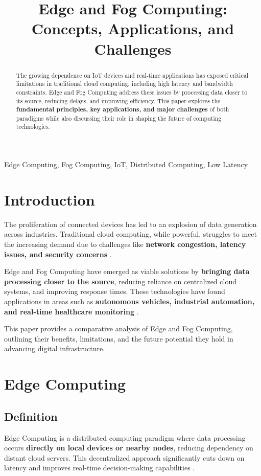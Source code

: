 \documentclass[conference]{IEEEtran}
\title{Edge and Fog Computing: Concepts, Applications, and Challenges}
\author{
	\IEEEauthorblockN{Dilyara Daroglu} 
	\IEEEauthorblockA{
		Paris Lodron University of Salzburg \\
		Wissenschaftliche Arbeitstechniken und Präsentationen \\
		Email: dilyara.daroglu@stud.plus.ac.at
	}
}
\begin{document}
	
	\maketitle
	
	\begin{abstract}
		The growing dependence on IoT devices and real-time applications has exposed critical limitations in traditional cloud computing, including high latency and bandwidth constraints. Edge and Fog Computing address these issues by processing data closer to its source, reducing delays, and improving efficiency. This paper explores the \textbf{fundamental principles, key applications, and major challenges} of both paradigms while also discussing their role in shaping the future of computing technologies.
	\end{abstract}
	
	\begin{IEEEkeywords}
		Edge Computing, Fog Computing, IoT, Distributed Computing, Low Latency
	\end{IEEEkeywords}
	
	\section{Introduction}
	The proliferation of connected devices has led to an explosion of data generation across industries. Traditional cloud computing, while powerful, struggles to meet the increasing demand due to challenges like \textbf{network congestion, latency issues, and security concerns} \cite{weber2021edge}. 
	
	Edge and Fog Computing have emerged as viable solutions by \textbf{bringing data processing closer to the source}, reducing reliance on centralized cloud systems, and improving response times. These technologies have found applications in areas such as \textbf{autonomous vehicles, industrial automation, and real-time healthcare monitoring} \cite{ibm2022edge}. 
	
	This paper provides a comparative analysis of Edge and Fog Computing, outlining their benefits, limitations, and the future potential they hold in advancing digital infrastructure.
	
	\section{Edge Computing}
	\subsection{Definition}
	Edge Computing is a distributed computing paradigm where data processing occurs \textbf{directly on local devices or nearby nodes}, reducing dependency on distant cloud servers. This decentralized approach significantly cuts down on latency and improves real-time decision-making capabilities \cite{shi2016edge}.
	
\end{document}
